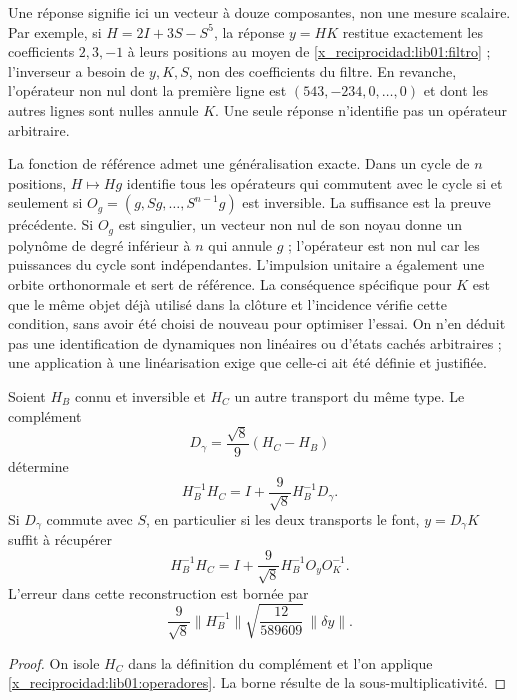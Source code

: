 Une réponse signifie ici un vecteur à douze composantes, non une
mesure scalaire. Par exemple, si \(H=2I+3S-S^5\), la réponse
\(y=HK\) restitue exactement les coefficients \(2,3,-1\) à leurs
positions au moyen de \eqref{x_reciprocidad:lib01:filtro} ; l’inverseur a besoin de \(y,K,S\),
non des coefficients du filtre. En revanche, l’opérateur non nul dont la première
ligne est \((543,-234,0,\ldots,0)\) et dont les autres lignes sont nulles
annule \(K\). Une seule réponse n’identifie pas un opérateur arbitraire.

La fonction de référence admet une généralisation exacte. Dans un cycle de
\(n\) positions, \(H\mapsto Hg\) identifie tous les opérateurs
qui commutent avec le cycle si et seulement si
\(O_g=(g,Sg,\ldots,S^{n-1}g)\) est inversible. La suffisance est la
preuve précédente. Si \(O_g\) est singulier, un vecteur non nul de son noyau
donne un polynôme de degré inférieur à \(n\) qui annule \(g\) ; l’opérateur
est non nul car les puissances du cycle sont indépendantes. L’impulsion
unitaire a également une orbite orthonormale et sert de référence. La
conséquence spécifique pour \(K\) est que le même objet déjà utilisé dans
la clôture et l’incidence vérifie cette condition, sans avoir été choisi de
nouveau pour optimiser l’essai. On n’en déduit pas une identification de
dynamiques non linéaires ou d’états cachés arbitraires ; une application à
une linéarisation exige que celle-ci ait été définie et justifiée.

\begin{corollary}
\label{x_reciprocidad:lib01:holonomia}
Soient \(H_B\) connu et inversible et \(H_C\) un autre transport du même type. Le complément
\[
 D_\gamma=\frac{\sqrt8}{9}(H_C-H_B)
\]
détermine
\[
 H_B^{-1}H_C=I+\frac9{\sqrt8}H_B^{-1}D_\gamma.
\]
Si \(D_\gamma\) commute avec \(S\), en particulier si les deux
transports le font, \(y=D_\gamma K\) suffit à récupérer
\begin{equation}
 H_B^{-1}H_C
 =I+\frac9{\sqrt8}H_B^{-1}O_yO_K^{-1}.
 \label{x_reciprocidad:lib01:holonomia-una-respuesta}
\end{equation}
L'erreur dans cette reconstruction est bornée par
\[
 \frac9{\sqrt8}\|H_B^{-1}\|
 \sqrt{\frac{12}{589609}}\,\|\delta y\|.
\]
\end{corollary}
\begin{proof}
On isole \(H_C\) dans la définition du complément et l'on applique \cref{x_reciprocidad:lib01:operadores}. La borne résulte de la sous-multiplicativité.
\end{proof}

